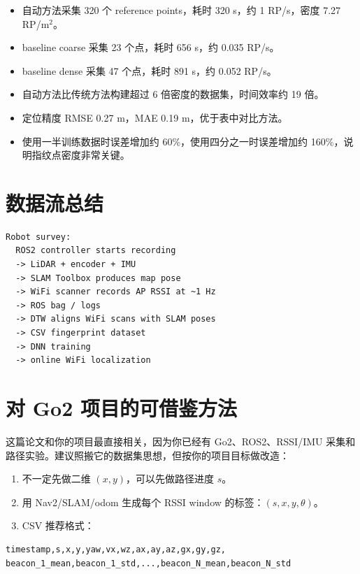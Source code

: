 \documentclass[UTF8,a4paper,12pt]{ctexrep}
\begin{document}
\begin{itemize}
  \item 自动方法采集 320 个 reference points，耗时 320 s，约 1 RP/s，密度 7.27 RP/m\(^2\)。
  \item baseline coarse 采集 23 个点，耗时 656 s，约 0.035 RP/s。
  \item baseline dense 采集 47 个点，耗时 891 s，约 0.052 RP/s。
  \item 自动方法比传统方法构建超过 6 倍密度的数据集，时间效率约 19 倍。
  \item 定位精度 RMSE 0.27 m，MAE 0.19 m，优于表中对比方法。
  \item 使用一半训练数据时误差增加约 60\%，使用四分之一时误差增加约 160\%，说明指纹点密度非常关键。
\end{itemize}

\section{数据流总结}

\begin{lstlisting}
Robot survey:
  ROS2 controller starts recording
  -> LiDAR + encoder + IMU
  -> SLAM Toolbox produces map pose
  -> WiFi scanner records AP RSSI at ~1 Hz
  -> ROS bag / logs
  -> DTW aligns WiFi scans with SLAM poses
  -> CSV fingerprint dataset
  -> DNN training
  -> online WiFi localization
\end{lstlisting}

\section{对 Go2 项目的可借鉴方法}

这篇论文和你的项目最直接相关，因为你已经有 Go2、ROS2、RSSI/IMU 采集和路径实验。建议照搬它的数据集思想，但按你的项目目标做改造：

\begin{enumerate}
  \item 不一定先做二维 \((x,y)\)，可以先做路径进度 \(s\)。
  \item 用 Nav2/SLAM/odom 生成每个 RSSI window 的标签：\((s,x,y,\theta)\)。
  \item CSV 推荐格式：
\end{enumerate}

\begin{lstlisting}
timestamp,s,x,y,yaw,vx,wz,ax,ay,az,gx,gy,gz,
beacon_1_mean,beacon_1_std,...,beacon_N_mean,beacon_N_std
\end{lstlisting}
\end{document}
